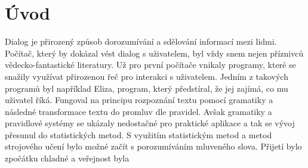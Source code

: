 \chapter*{Úvod}

Dialog je přirozený způsob dorozumívání a sdělování informací mezi lidmi.
Počítač, který by dokázal vést dialog s uživatelem, byl vždy snem nejen
příznivců vědecko-fantastické literatury.
Už pro první počítače vnikaly programy, které se snažily využívat přirozenou
řeč pro interakci s uživatelem.
Jedním z takových programů byl například Eliza, program, který předstíral, že
jej zajímá, co mu uživatel říká.
Fungoval na principu rozpoznání textu pomocí gramatiky a následné transformace
textu do promluv dle pravidel.
Avšak gramatiky a pravidlové systémy se ukázaly nedostačné pro praktické
aplikace a tak se vývoj přesunul do statistických metod.
S využitím statistickým metod a metod strojového učení bylo možné začít s
porozumíváním mluveného slova.
Přijetí bylo zpočátku chladné a veřejnost byla 
